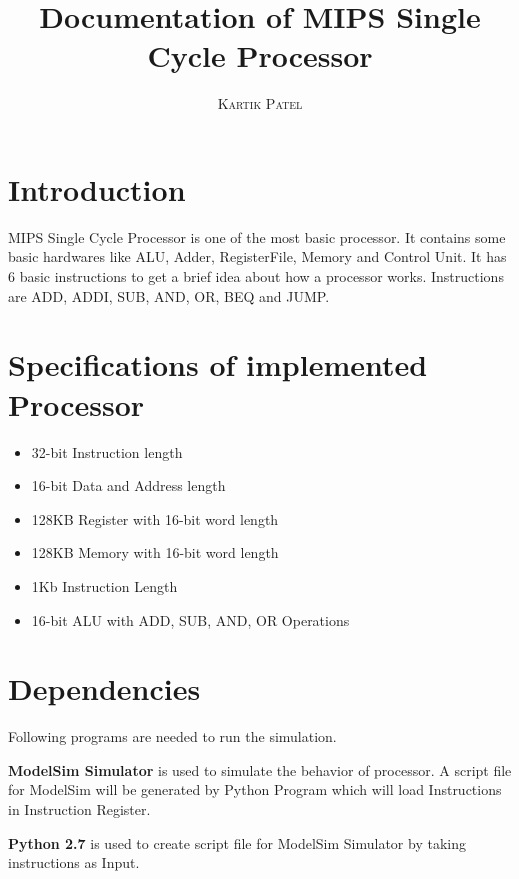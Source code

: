 \documentclass[a4paper,12pt]{article}
\begin{document}
\title{\textbf{Documentation of MIPS Single Cycle Processor}}
\author{\textsc{Kartik Patel}}
\date{}
\maketitle

\section{Introduction}
MIPS Single Cycle Processor is one of the most basic processor. It contains some basic hardwares like ALU, Adder, RegisterFile, Memory and Control Unit. It has 6 basic instructions to get a brief idea about how a processor works. Instructions are ADD, ADDI, SUB, AND, OR, BEQ and JUMP.

\section{Specifications of implemented Processor}
\begin{itemize}
\item 32-bit Instruction length
\item 16-bit Data and Address length
\item 128KB Register with 16-bit word length
\item 128KB Memory with 16-bit word length
\item 1Kb Instruction Length
\item 16-bit ALU with ADD, SUB, AND, OR Operations
\end{itemize}

\section{Dependencies}
Following programs are needed to run the simulation.
\begin{description}
\item{\textbf{ModelSim Simulator}} is used to simulate the behavior of processor. A script file for ModelSim will be generated by Python Program which will load Instructions in Instruction Register.
\item{\textbf{Python 2.7}} is used to create script file for ModelSim Simulator by taking instructions as Input.
\end{description}
\end{document}
